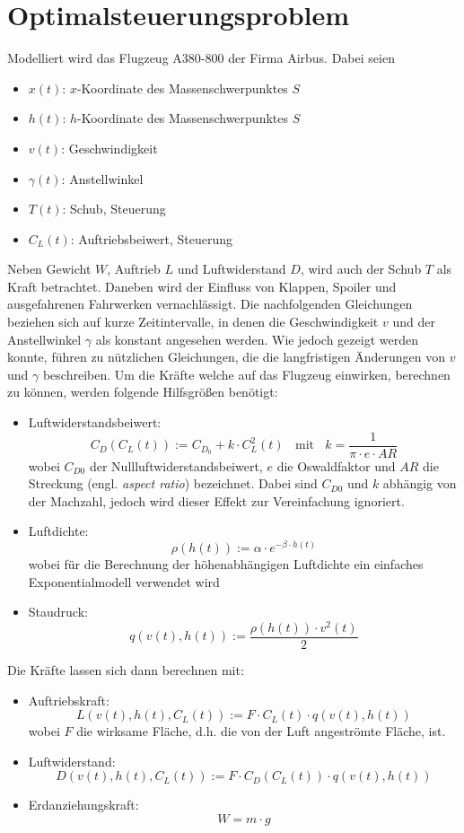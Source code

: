 \chapter{Optimalsteuerungsproblem} \label{cha:optim}

Modelliert wird das Flugzeug A380-800 der Firma Airbus. Dabei seien
\begin{itemize}
    \item $x(t)$: $x$-Koordinate des Massenschwerpunktes $S$
    \item $h(t)$: $h$-Koordinate des Massenschwerpunktes $S$
    \item $v(t)$: Geschwindigkeit
    \item $\gamma(t)$: Anstellwinkel
    \item $T(t)$: Schub, Steuerung
    \item $C_L(t)$: Auftriebsbeiwert, Steuerung
\end{itemize}
Neben Gewicht \(W\), Auftrieb \(L\) und Luftwiderstand \(D\), wird auch der Schub \(T\) als Kraft betrachtet. Daneben wird der Einfluss von Klappen, Spoiler und ausgefahrenen Fahrwerken vernachlässigt. Die nachfolgenden Gleichungen beziehen sich auf kurze Zeitintervalle, in denen die Geschwindigkeit $v$ und der Anstellwinkel $\gamma$ als konstant angesehen werden. Wie jedoch gezeigt werden konnte, führen zu nützlichen Gleichungen, die die langfristigen Änderungen von $v$ und $\gamma$ beschreiben. Um die Kräfte welche auf das Flugzeug einwirken, berechnen zu können, werden folgende Hilfsgrößen benötigt:
\begin{itemize}
    \item Luftwiderstandsbeiwert: \[C_D(C_L(t)) := C_{D_0} + k \cdot C^2_L(t) \ \ \ \ \text{mit} \ \ \ \ k = \dfrac{1}{\pi \cdot e \cdot AR}\] wobei $C_{D0}$ der Nullluftwiderstandsbeiwert, $e$ die Oswaldfaktor und $AR$ die Streckung (engl. \textit{aspect ratio}) bezeichnet. Dabei sind $C_{D0}$ und $k$ abhängig von der Machzahl, jedoch wird dieser Effekt zur Vereinfachung ignoriert. 
    \item Luftdichte: \[\rho(h(t)) := \alpha \cdot e^{-\beta \cdot h(t)}\]  wobei für die Berechnung der höhenabhängigen Luftdichte ein einfaches Exponentialmodell verwendet wird%
    \item Staudruck: \[q(v(t), h(t)) := \dfrac{\rho(h(t)) \cdot v^2(t)}{2} \]
\end{itemize}
Die Kräfte lassen sich dann berechnen mit:
\begin{itemize}
    \item Auftriebskraft: \[L(v(t), h(t), C_L(t)) := F \cdot C_L(t) \cdot q(v(t), h(t))\] wobei $F$ die wirksame Fläche, d.h. die von der Luft angeströmte Fläche, ist.
    \item Luftwiderstand: \[D(v(t), h(t), C_L(t)) := F \cdot C_D(C_L(t)) \cdot q(v(t), h(t))\]
    \item Erdanziehungskraft: \[W = m \cdot g\]
\end{itemize}

